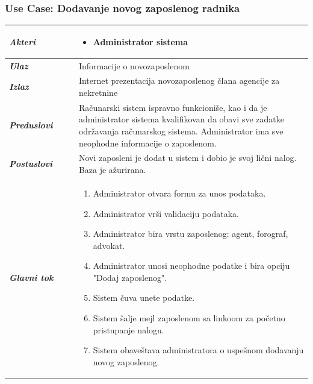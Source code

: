 \documentclass[20pt]{article}
\begin{document}
\subsubsection{\bfseries \large Use Case: Dodavanje novog zaposlenog radnika}

\begin{center}
\begin{longtable}{p{0.23\linewidth} p{0.77\linewidth}}
 \hline
 {\it \bfseries Akteri} & \begin{itemize}
    \item Administrator sistema
\end{itemize}\\
\hline

 {\it \bfseries Ulaz} & Informacije o novozaposlenom\\
 \hline
 
 {\it \bfseries Izlaz} & Internet prezentacija novozaposlenog \v {c}lana agencije za nekretnine\\
 \hline
 
 {\it \bfseries Preduslovi} & Ra\v {c}unarski sistem ispravno funkcioni\v {s}e, kao i da je administrator sistema kvalifikovan da obavi sve zadatke odr\v {z}avanja ra\v {c}unarskog sistema. Administrator ima sve neophodne informacije o zaposlenom.\\
 \hline

 {\it \bfseries Postuslovi} & Novi zaposleni je dodat u sistem i dobio je svoj li\v {c}ni nalog. Baza je a\v {z}urirana.\\
 \hline

     {\it \bfseries Glavni tok} &  
     \begin{enumerate}
         \item Administrator otvara formu za unos podataka.
         \item Administrator vr\v {s}i validaciju podataka.
         \item Administrator bira vrstu zaposlenog: agent, forograf, advokat.
         \item Administrator unosi neophodne podatke i bira opciju "Dodaj zaposlenog".
         \item Sistem \v {c}uva unete podatke.
         \item Sistem \v {s}alje mejl zaposlenom sa linkoom za po\v {c}etno pristupanje nalogu.
         \item Sistem obave\v {s}tava administratora o uspe\v {s}nom dodavanju novog zaposlenog.
    \end{enumerate}\\
 \hline


\end{longtable}
\end{center}
\end{document}
